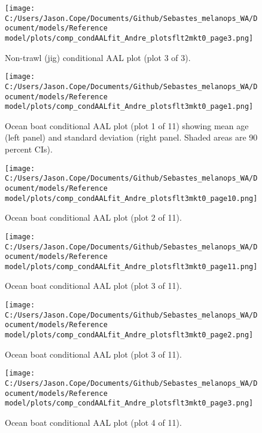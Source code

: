 \documentclass[11pt,
  english,
  letterpaper,
]{article}
\begin{document}
\begin{figure}
\centering
\texttt{[image: C:/Users/Jason.Cope/Documents/Github/Sebastes\_melanops\_WA/Document/models/Reference model/plots/comp\_condAALfit\_Andre\_plotsflt2mkt0\_page3.png]}
\caption{Non-trawl (jig) conditional AAL plot (plot 3 of 3).\label{fig:comp_condAALfit_Andre_plotsflt2mkt0_page3}}
\end{figure}

\begin{figure}
\centering
\texttt{[image: C:/Users/Jason.Cope/Documents/Github/Sebastes\_melanops\_WA/Document/models/Reference model/plots/comp\_condAALfit\_Andre\_plotsflt3mkt0\_page1.png]}
\caption{Ocean boat conditional AAL plot (plot 1 of 11) showing mean age (left panel) and standard deviation (right panel. Shaded areas are 90 percent CIs).\label{fig:comp_condAALfit_Andre_plotsflt3mkt0_page1}}
\end{figure}

\begin{figure}
\centering
\texttt{[image: C:/Users/Jason.Cope/Documents/Github/Sebastes\_melanops\_WA/Document/models/Reference model/plots/comp\_condAALfit\_Andre\_plotsflt3mkt0\_page10.png]}
\caption{Ocean boat conditional AAL plot (plot 2 of 11).\label{fig:comp_condAALfit_Andre_plotsflt3mkt0_page10}}
\end{figure}

\begin{figure}
\centering
\texttt{[image: C:/Users/Jason.Cope/Documents/Github/Sebastes\_melanops\_WA/Document/models/Reference model/plots/comp\_condAALfit\_Andre\_plotsflt3mkt0\_page11.png]}
\caption{Ocean boat conditional AAL plot (plot 3 of 11).\label{fig:comp_condAALfit_Andre_plotsflt3mkt0_page11}}
\end{figure}

\begin{figure}
\centering
\texttt{[image: C:/Users/Jason.Cope/Documents/Github/Sebastes\_melanops\_WA/Document/models/Reference model/plots/comp\_condAALfit\_Andre\_plotsflt3mkt0\_page2.png]}
\caption{Ocean boat conditional AAL plot (plot 3 of 11).\label{fig:comp_condAALfit_Andre_plotsflt3mkt0_page2}}
\end{figure}

\begin{figure}
\centering
\texttt{[image: C:/Users/Jason.Cope/Documents/Github/Sebastes\_melanops\_WA/Document/models/Reference model/plots/comp\_condAALfit\_Andre\_plotsflt3mkt0\_page3.png]}
\caption{Ocean boat conditional AAL plot (plot 4 of 11).\label{fig:comp_condAALfit_Andre_plotsflt3mkt0_page3}}
\end{figure}
\end{document}
